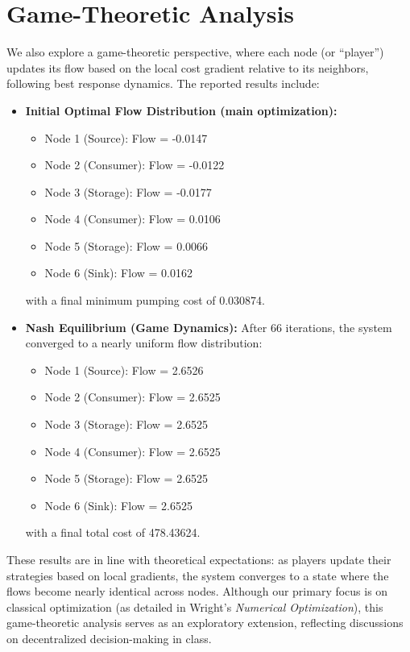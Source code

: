 \documentclass{article}
\begin{document}
\section{Game-Theoretic Analysis}
We also explore a game-theoretic perspective, where each node (or “player”) updates its flow based on the local cost gradient relative to its neighbors, following best response dynamics. The reported results include:
\begin{itemize}
    \item \textbf{Initial Optimal Flow Distribution (main optimization):}
    \begin{itemize}
        \item Node 1 (Source): Flow = -0.0147
        \item Node 2 (Consumer): Flow = -0.0122
        \item Node 3 (Storage): Flow = -0.0177
        \item Node 4 (Consumer): Flow = 0.0106
        \item Node 5 (Storage): Flow = 0.0066
        \item Node 6 (Sink): Flow = 0.0162
    \end{itemize}
    with a final minimum pumping cost of 0.030874.
    \item \textbf{Nash Equilibrium (Game Dynamics):} After 66 iterations, the system converged to a nearly uniform flow distribution:
    \begin{itemize}
        \item Node 1 (Source): Flow = 2.6526
        \item Node 2 (Consumer): Flow = 2.6525
        \item Node 3 (Storage): Flow = 2.6525
        \item Node 4 (Consumer): Flow = 2.6525
        \item Node 5 (Storage): Flow = 2.6525
        \item Node 6 (Sink): Flow = 2.6525
    \end{itemize}
    with a final total cost of 478.43624.
\end{itemize}
These results are in line with theoretical expectations: as players update their strategies based on local gradients, the system converges to a state where the flows become nearly identical across nodes. Although our primary focus is on classical optimization (as detailed in Wright's \textit{Numerical Optimization}), this game-theoretic analysis serves as an exploratory extension, reflecting discussions on decentralized decision-making in class.
\end{document}
